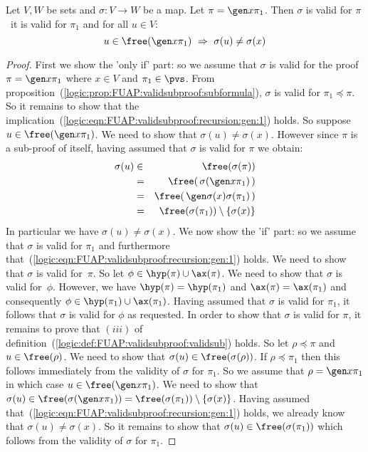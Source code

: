 \begin{prop}\label{logic:prop:FUAP:validsubproof:recursion:gen}
Let $V, W$ be sets and $\sigma:V\to W$ be a map. Let $\pi=\gen
x\pi_{1}$. Then $\sigma$ is valid for $\pi$ \ifand\ it is valid for
$\pi_{1}$ and for all $u\in V$:
    \begin{equation}\label{logic:eqn:FUAP:validsubproof:recursion:gen:1}
    u\in\free(\gen x\pi_{1})\ \Rightarrow\
    \sigma(u)\neq\sigma(x)
    \end{equation}
\end{prop}
\begin{proof}
First we show the 'only if' part: so we assume that $\sigma$ is
valid for the proof $\pi=\gen x\pi_{1}$ where $x\in V$ and
$\pi_{1}\in\pvs$. From
proposition~(\ref{logic:prop:FUAP:validsubproof:subformula}),
$\sigma$ is valid for $\pi_{1}\preceq\pi$. So it remains to show
that the
implication~(\ref{logic:eqn:FUAP:validsubproof:recursion:gen:1})
holds. So suppose $u\in\free(\gen x\pi_{1})$. We need to show that
$\sigma(u)\neq\sigma(x)$. However since $\pi$ is a sub-proof of
itself, having assumed that $\sigma$ is valid for $\pi$ we obtain:
    \begin{eqnarray*}
    \sigma(u)&\in&\free(\sigma(\pi))\\
    &=&\free(\,\sigma(\gen x\pi_{1})\,)\\
    &=&\free(\,\gen\sigma(x)\sigma(\pi_{1})\,)\\
    &=&\free(\sigma(\pi_{1}))\setminus\{\sigma(x)\}\\
    \end{eqnarray*}
In particular we have $\sigma(u)\neq\sigma(x)$. We now show the 'if'
part: so we assume that $\sigma$ is valid for $\pi_{1}$ and
furthermore
that~(\ref{logic:eqn:FUAP:validsubproof:recursion:gen:1}) holds. We
need to show that $\sigma$ is valid for~$\pi$. So let
$\phi\in\hyp(\pi)\cup\ax(\pi)$. We need to show that $\sigma$ is
valid for~$\phi$. However, we have $\hyp(\pi)=\hyp(\pi_{1})$ and
$\ax(\pi)=\ax(\pi_{1})$ and consequently
$\phi\in\hyp(\pi_{1})\cup\ax(\pi_{1})$. Having assumed that $\sigma$
is valid for $\pi_{1}$, it follows that $\sigma$ is valid for $\phi$
as requested. In order to show that $\sigma$ is valid for $\pi$, it
remains to prove that $(iii)$ of
definition~(\ref{logic:def:FUAP:validsubproof:validsub}) holds. So
let $\rho\preceq\pi$ and $u\in\free(\rho)$. We need to show that
$\sigma(u)\in\free(\sigma(\rho))$. If $\rho\preceq\pi_{1}$ then this
follows immediately from the validity of $\sigma$ for $\pi_{1}$. So
we assume that $\rho=\gen x\pi_{1}$ in which case $u\in\free(\gen
x\pi_{1})$. We need to show that $\sigma(u)\in \free(\sigma(\gen
x\pi_{1}))=\free(\sigma(\pi_{1}))\setminus\{\sigma(x)\}$. Having
assumed that~(\ref{logic:eqn:FUAP:validsubproof:recursion:gen:1})
holds, we already know that $\sigma(u)\neq\sigma(x)$. So it remains
to show that $\sigma(u)\in\free(\sigma(\pi_{1}))$ which follows from
the validity of $\sigma$ for $\pi_{1}$.
\end{proof}

